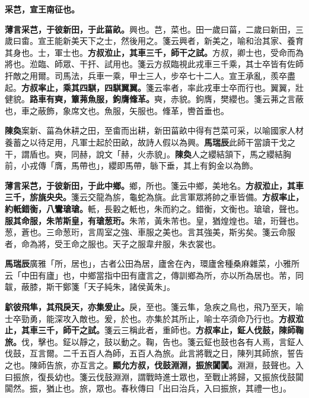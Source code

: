 
\textbf{采芑，宣王南征也。}

\textbf{薄言采芑，于彼新田，于此菑畝。}{\footnotesize 興也。芑，菜也。田一歲曰菑，二歲曰新田，三歲曰畬。宣王能新美天下之士，然後用之。箋云興者，新美之，喻和治其家、養育其身也。士，軍士也。}\textbf{方叔涖止，其車三千，師干之試。}{\footnotesize 方叔，卿士也，受命而為將也。涖臨、師眾、干扞、試用也。箋云方叔臨視此戎車三千乘，其士卒皆有佐師扞敵之用爾。司馬法，兵車一乘，甲士三人，步卒七十二人。宣王承亂，羨卒盡起。}\textbf{方叔率止，乘其四騏，四騏翼翼。}{\footnotesize 箋云率者，率此戎車士卒而行也。翼翼，壯健貌。}\textbf{路車有奭，簟茀魚服，鉤膺鞗革。}{\footnotesize 奭，赤貌。鉤膺，樊纓也。箋云茀之言蔽也，車之蔽飾，象席文也。魚服，矢服也。鞗革，轡首垂也。}

\begin{quoting}\textbf{陳奐}案新、菑為休耕之田，至畬而出耕，新田菑畝中得有芑菜可采，以喻國家人材養蓄之以待足用，凡軍士起於田畝，故詩人假以為興。\textbf{馬瑞辰}此師干當讀干戈之干，謂盾也。奭，同赫，說文「赫，火赤貌」。\textbf{陳奐}人之纓結頷下，馬之纓結胸前，小戎傳「膺，馬帶也」，纓即馬帶，䋣下垂，其上有鉤金以為飾。\end{quoting}

\textbf{薄言采芑，于彼新田，于此中鄉。}{\footnotesize 鄉，所也。箋云中鄉，美地名。}\textbf{方叔涖止，其車三千，旂旐央央。}{\footnotesize 箋云交龍為旂，龜蛇為旐。此言軍眾將帥之車皆備。}\textbf{方叔率止，約軝錯衡，八鸞瑲瑲。}{\footnotesize 軝，長轂之軝也，朱而約之。錯衡，文衡也。瑲瑲，聲也。}\textbf{服其命服，朱芾斯皇，有瑲葱珩。}{\footnotesize 朱芾，黃朱芾也。皇，猶煌煌也。瑲，珩聲也。葱，蒼也。三命葱珩，言周室之強、車服之美也。言其強美，斯劣矣。箋云命服者，命為將，受王命之服也。天子之服韋弁服，朱衣裳也。}

\begin{quoting}\textbf{馬瑞辰}廣雅「所，居也」，古者公田為居，廬舍在內，環廬舍種桑麻雜菜，小雅所云「中田有廬」也，中鄉當指中田有廬言之，傳訓鄉為所，亦以所為居也。芾，同韍，蔽膝，斯干鄭箋「天子純朱，諸侯黃朱」。\end{quoting}

\textbf{鴥彼飛隼，其飛戾天，亦集爰止。}{\footnotesize 戾，至也。箋云隼，急疾之鳥也，飛乃至天，喻士卒勁勇，能深攻入敵也。爰，於也。亦集於其所止，喻士卒須命乃行也。}\textbf{方叔涖止，其車三千，師干之試。}{\footnotesize 箋云三稱此者，重師也。}\textbf{方叔率止，鉦人伐鼓，陳師鞠旅。}{\footnotesize 伐，擊也。鉦以靜之，鼓以動之。鞠，告也。箋云鉦也鼓也各有人焉，言鉦人伐鼓，互言爾。二千五百人為師，五百人為旅。此言將戰之日，陳列其師旅，誓告之也。陳師告旅，亦互言之。}\textbf{顯允方叔，伐鼓淵淵，振旅闐闐。}{\footnotesize 淵淵，鼓聲也。入曰振旅，復長幼也。箋云伐鼓淵淵，謂戰時進士眾也，至戰止將歸，又振旅伐鼓闐闐然。振，猶止也。旅，眾也。春秋傳曰「出曰治兵，入曰振旅，其禮一也」。}


